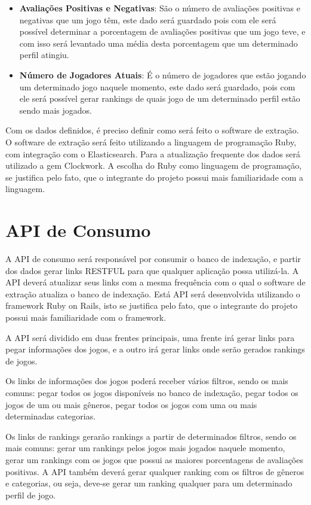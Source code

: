 \begin{itemize}
	\item \textbf{Avaliações Positivas e Negativas}: São o número de avaliações positivas e negativas que um jogo têm, este dado será guardado pois com ele será possível determinar a porcentagem de avaliações positivas que um jogo teve, e com isso será levantado uma média desta porcentagem que um determinado perfil atingiu.
	\item \textbf{Número de Jogadores Atuais}: É o número de jogadores que estão jogando um determinado jogo naquele momento, este dado será guardado, pois com ele será possível gerar rankings de quais jogo de um determinado perfil estão sendo mais jogados.
\end{itemize}
Com os dados definidos, é preciso definir como será feito o software de extração. O software de extração será feito utilizando a linguagem de programação Ruby, com integração com o Elasticsearch. Para a atualização frequente dos dados será utilizado a gem Clockwork. A escolha do Ruby como linguagem de programação, se justifica pelo fato, que o integrante do projeto possui mais familiaridade com a linguagem.
\section{API de Consumo}
A API de consumo será responsável por consumir o banco de indexação, e partir dos dados gerar links RESTFUL para que qualquer aplicação possa utilizá-la. A API deverá atualizar seus links com a mesma frequência com o qual o software de extração atualiza o banco de indexação. Está API será desenvolvida utilizando o framework Ruby on Rails, isto se justifica pelo fato, que o integrante do projeto possui mais familiaridade com o framework.

A API será dividido em duas frentes principais, uma frente irá gerar links para pegar informações dos jogos, e a outro irá gerar links onde serão gerados rankings de jogos.

Os links de informações dos jogos poderá receber vários filtros, sendo os mais comuns: pegar todos os jogos disponíveis no banco de indexação, pegar todos os jogos de um ou mais gêneros, pegar todos os jogos com uma ou mais determinadas categorias.

Os links de rankings gerarão rankings a partir de determinados filtros, sendo os mais comuns: gerar um rankings pelos jogos mais jogados naquele momento, gerar um rankings com os jogos que possui as maiores porcentagens de avaliações positivas. A API também deverá gerar qualquer ranking com os filtros de gêneros e categorias, ou seja, deve-se gerar um ranking qualquer para um determinado perfil de jogo.
